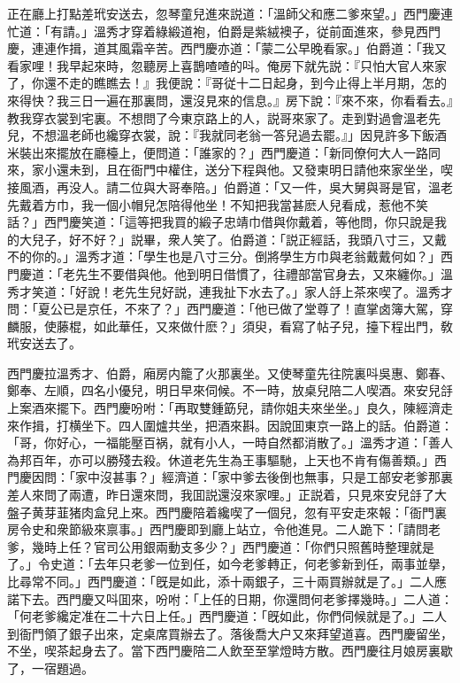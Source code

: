 正在廳上打點差玳安送去，忽琴童兒進來説道：「溫師父和應二爹來望。」西門慶連忙道：「有請。」溫秀才穿着綠緞道袍，伯爵是紫絨襖子，従前面進來，參見西門慶，連連作揖，道其風霜辛苦。西門慶亦道：「蒙二公早晚看家。」伯爵道：「我又看家哩！我早起來時，忽聽房上喜鵲喳喳的呌。俺房下就先説：『只怕大官人來家了，你還不走的瞧瞧去！』我便說：『哥従十二日起身，到今止得上半月期，怎的來得快？我三日一遍在那裏問，還沒見來的信息。』房下說：『來不來，你看看去。』教我穿衣裳到宅裏。不想問了今東京路上的人，説哥來家了。走到對過會溫老先兒，不想溫老師也纔穿衣裳，說：『我就同老翁一答兒過去罷。』」因見許多下飯酒米裝出來擺放在廳檯上，便問道：「誰家的？」西門慶道：「新同僚何大人一路同來，家小還未到，且在衙門中權住，送分下程與他。又發柬明日請他來家坐坐，喫接風酒，再没人。請二位與大哥奉陪。」伯爵道：「又一件，吳大舅與哥是官，溫老先戴着方巾，我一個小帽兒怎陪得他坐！不知把我當甚麽人兒看成，惹他不笑話？」西門慶笑道：「這等把我買的緞子忠靖巾借與你戴着，等他問，你只說是我的大兒子，好不好？」説畢，衆人笑了。伯爵道：「説正經話，我頭八寸三，又戴不的你的。」溫秀才道：「學生也是八寸三分。倒將學生方巾與老翁戴戴何如？」西門慶道：「老先生不要借與他。他到明日借慣了，往禮部當官身去，又來纏你。」溫秀才笑道：「好說！老先生兒好説，連我扯下水去了。」家人㧱上茶來喫了。溫秀才問：「夏公已是京任，不來了？」西門慶道：「他已做了堂尊了！直掌卤簿大駕，穿麟服，使藤棍，如此華任，又來做什麽？」須臾，看寫了帖子兒，擡下程出門，敎玳安送去了。

西門慶拉溫秀才、伯爵，廂房内籠了火那裏坐。又使琴童先往院裏呌吳惠、鄭春、鄭奉、左順，四名小優兒，明日早來伺候。不一時，放桌兒陪二人喫酒。來安兒㧱上案酒來擺下。西門慶吩咐：「再取雙鍾筯兒，請你姐夫來坐坐。」良久，陳經濟走來作揖，打横坐下。四人圍爐共坐，把酒來斟。因說囬東京一路上的話。伯爵道：「哥，你好心，一福能壓百祸，就有小人，一時自然都消散了。」溫秀才道：「善人為邦百年，亦可以勝殘去殺。休道老先生為王事驅馳，上天也不肯有傷善類。」西門慶因問：「家中沒甚事？」經濟道：「家中爹去後倒也無事，只是工部安老爹那裏差人來問了兩遭，昨日還來問，我囬説還沒來家哩。」正説着，只見來安兒㧱了大盤子黄芽韮猪肉盒兒上來。西門慶陪着纔喫了一個兒，忽有平安走來報：「衙門裏房令史和衆節級來禀事。」西門慶即到廳上站立，令他進見。二人跪下：「請問老爹，幾時上任？官司公用銀兩動支多少？」西門慶道：「你們只照舊時整理就是了。」令史道：「去年只老爹一位到任，如今老爹轉正，何老爹新到任，兩事並擧，比尋常不同。」西門慶道：「旣是如此，添十兩銀子，三十兩買辦就是了。」二人應諾下去。西門慶又呌囬來，吩咐：「上任的日期，你還問何老爹擇幾時。」二人道：「何老爹纔定准在二十六日上任。」西門慶道：「旣如此，你們伺候就是了。」二人到衙門領了銀子出來，定桌席買辦去了。落後喬大户又來拜望道喜。西門慶留坐，不坐，喫茶起身去了。當下西門慶陪二人飲至至掌燈時方散。西門慶往月娘房裏歇了，一宿題過。

